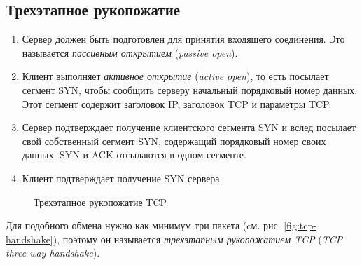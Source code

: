 \subsection{Трехэтапное рукопожатие}
\begin{enumerate}
  \item Сервер должен быть подготовлен для принятия входящего соединения. Это называется \emph{пассивным открытием} (\emph{passive open}).
  \item Клиент выполняет \emph{активное открытие} (\emph{active open}), то есть посылает сегмент SYN, чтобы сообщить серверу начальный порядковый номер данных. Этот сегмент содержит заголовок IP, заголовок TCP и параметры TCP.
  \item Сервер подтверждает получение клиентского сегмента SYN и вслед посылает свой собственный сегмент SYN, содержащий порядковый номер своих данных. SYN и ACK отсылаются в одном сегменте.
  \item Клиент подтверждает получение SYN сервера.
\end{enumerate}

\noindent
\begin{figure}[h!]
  \centering
  \caption{Трехэтапное рукопожатие TCP}
  \label{fig:tcp-handshake}
\end{figure}

Для подобного обмена нужно как минимум три пакета (cм. рис. \vref{fig:tcp-handshake}), поэтому он называется \emph{трехэтапным рукопожатием TCP} (\emph{TCP three-way handshake}).

